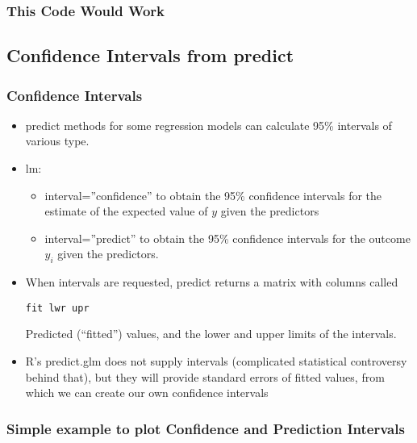 \documentclass[10pt,english]{beamer}
\def\lyxframeend{} %
\def\Sweavesize{\normalsize}
\begin{document}
\begin{frame}
\frametitle{This Code Would Work}




\end{frame}


\lyxframeend{}\subsection{Confidence Intervals from predict}

\begin{frame}[containsverbatim]
\frametitle{Confidence Intervals}
\begin{itemize}
\item predict methods for some regression models can calculate 95\% intervals
of various type.
\item lm: 

\begin{itemize}
\item interval=''confidence'' to obtain the 95\% confidence intervals
for the estimate of the expected value of $y$ given the predictors
\item interval=''predict'' to obtain the 95\% confidence intervals for
the outcome $y_{i}$ given the predictors.
\end{itemize}
\item When intervals are requested, predict returns a matrix with columns
called


\begin{lstlisting}
fit lwr upr
\end{lstlisting}


Predicted (``fitted'') values, and the lower and upper limits of
the intervals.

\item R's predict.glm does not supply intervals (complicated statistical
controversy behind that), but they will provide standard errors of
fitted values, from which we can create our own confidence intervals
\end{itemize}
\end{frame}

\begin{frame}[containsverbatim]
\frametitle{Simple example to plot Confidence and Prediction Intervals}


\def\Sweavesize{\scriptsize}


\end{frame}
\end{document}

